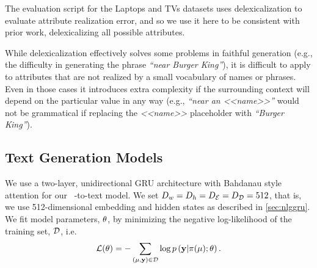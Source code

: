 The evaluation script for the Laptops and TVs datasets uses delexicalization to
evaluate attribute realization error, and so we use it here to be consistent
with prior work, delexicalizing all possible attributes.

While delexicalization effectively solves some problems in faithful generation
(e.g., the difficulty in generating the phrase \textit{``near Burger King''}),
it is difficult to apply to attributes that are not realized by a small
vocabulary of names or phrases. Even in those cases it introduces extra
complexity if the surrounding context will depend on the particular value in
any way (e.g., \textit{``near an <<name>>''} would not be grammatical if
replacing the \textit{<<name>>} placeholder with \textit{``Burger King''}).

\subsection{Text Generation Models}
\label{sec:fgtgm}

We use a two-layer, unidirectional GRU architecture with Bahdanau style
attention for our \sequencetosequence~\meaningrepresentation-to-text model. We
set $D_{w} = D_{h} = {D_\mathcal{E}} = {D_\mathcal{D}} = 512$, that is, we use
512-dimensional embedding and hidden states as described in
\autoref{sec:nlggru}.  We fit model parameters, $\theta$, by minimizing the
negative log-likelihood of the training set, $\mathcal{D}$, i.e.
\[\mathcal{L}(\theta) = - \sum_{(\mu, \mathbf{y}) \in \mathcal{D}  }  \log
p\left(\mathbf{y}|\pi(\mu);\theta\right).\]

